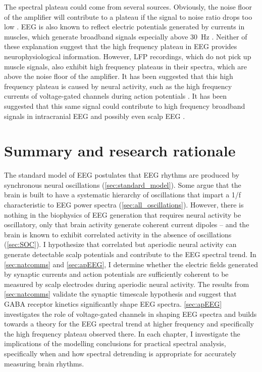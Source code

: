 The spectral plateau could come from several sources. Obviously, the noise floor of the amplifier will contribute to a plateau if the signal to noise ratio drops too low \cite{Scheer2006}. EEG is also known to reflect electric potentials generated by currents in muscles, which generate broadband signals especially above \qty{30}{\hertz} \cite{Muthukumaraswamy2013}. Neither of these explanation suggest that the high frequency plateau in EEG provides neurophysiological information. However, LFP recordings, which do not pick up muscle signals, also exhibit high frequency plateaus in their spectra, which are above the noise floor of the amplifier. It has been suggested that this high frequency plateau is caused by neural activity, such as the high frequency currents of voltage-gated channels during action potentials \cite{Ray2008, Ray2011, Gao2016, Zanos2010}. It has been suggested that this same signal could contribute to high frequency broadband signals in intracranial EEG and possibly even scalp EEG \cite{Ray2008}.

\section{Summary and research rationale}
The standard model of EEG postulates that EEG rhythms are produced by synchronous neural oscillations (\autoref{sec:standard_model}). Some argue that the brain is built to have a systematic hierarchy of oscillations that impart a 1/f characteristic to EEG power spectra (\autoref{sec:all_oscillations}). However, there is nothing in the biophysics of EEG generation that requires neural activity be oscillatory, only that brain activity generate coherent current dipoles -- and the brain is known to exhibit correlated activity in the absence of oscillations (\autoref{sec:SOC}). I hypothesize that correlated but aperiodic neural activity can generate detectable scalp potentials and contribute to the EEG spectral trend. In \autoref{sec:natcomms} and \autoref{sec:apEEG}, I determine whether the electric fields generated by synaptic currents and action potentials are sufficiently coherent to be measured by scalp electrodes during aperiodic neural activity. The results from \autoref{sec:natcomms} validate the synaptic timescale hypothesis and suggest that GABA receptor kinetics significantly shape EEG spectra. \autoref{sec:apEEG} investigates the role of voltage-gated channels in shaping EEG spectra and builds towards a theory for the EEG spectral trend at higher frequency and specifically the high frequency plateau observed there. In each chapter, I investigate the implications of the modelling conclusions for practical spectral analysis, specifically when and how spectral detrending is appropriate for accurately measuring brain rhythms.
